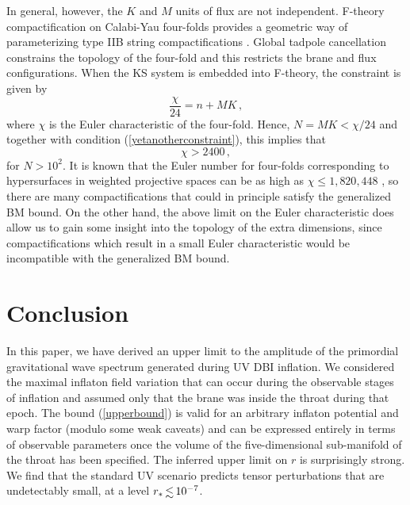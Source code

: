 In general, however, the $K$ and $M$ units of flux are not independent. 
F-theory compactification on Calabi-Yau four-folds
provides a geometric way of parameterizing  
type IIB string compactifications
\cite{witten1,witten2,witten3,sethi,gkp,klemm}. 
Global tadpole cancellation constrains the topology of the four-fold
and this restricts the brane and flux configurations.  
When the KS system is embedded into F-theory, the  
constraint is given by \cite{gkp}
\begin{equation}
\label{Ftheory}
\frac{\chi}{24} = n + MK \,,
\end{equation}
where $\chi$ is the Euler characteristic of the four-fold.  
Hence, $N = MK < \chi /24$ and together with condition 
(\ref{yetanotherconstraint}), this implies that
\begin{equation}
\label{chilimit}
\chi > 2400 \,,
\end{equation}
for $N > 10^2$.
It is known that the Euler number for four-folds 
corresponding to hypersurfaces in weighted projective spaces
can be as high as $\chi \le 1,820,448$ \cite{klemm},
so there are many compactifications that could 
in principle satisfy the generalized BM bound.
On the other hand, the above limit on the Euler characteristic 
does allow us to gain some insight into the 
topology of the extra dimensions, since compactifications 
which result in a small Euler characteristic would be  
incompatible with the generalized BM bound. 
% 
% 
% 
% 
% 
% 
\section{Conclusion} 
\label{Conclusion}

In this paper, we have derived an upper limit to
the amplitude of the primordial gravitational wave spectrum
generated during UV DBI inflation. We considered   
the maximal inflaton field variation   
that can occur during the observable stages of inflation and assumed  
only that the brane was inside the throat during that epoch. 
The bound (\ref{upperbound}) is valid for an arbitrary inflaton potential and 
warp factor (modulo some weak caveats) and can be expressed 
entirely in terms of observable parameters once the volume of 
the five-dimensional sub-manifold of the throat has been specified. 
The inferred upper limit on $r$ is surprisingly strong. 
We find that the standard UV  
scenario predicts tensor perturbations that are undetectably small, 
at a level ${r_*} \, {\lsim} \, {10^{-7}}$. 

